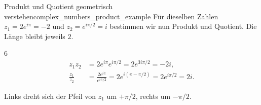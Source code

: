 \clearpage
\begin{ExampleBox}{Produkt und Quotient geometrisch verstehen}{complex_numbers_product_example}
  Für dieselben Zahlen $z_1=2e^{i\pi}=-2$ und $z_2=e^{i\pi/2}=i$
  bestimmen wir nun Produkt und Quotient. Die Länge bleibt jeweils $2$.
  \begin{ClozeArea}{6}
    \[
      \begin{aligned}
        z_1z_2&=2e^{i\pi}e^{i\pi/2}
                =2e^{3i\pi/2}=-2i,\\[8pt]
        \frac{z_1}{z_2}&=\frac{2e^{i\pi}}{e^{i\pi/2}}
                =2e^{i(\pi-\pi/2)}=2e^{i\pi/2}=2i.
      \end{aligned}
    \]
  \end{ClozeArea}
  \begin{center}
  \end{center}
  Links dreht sich der Pfeil von $z_1$ um $+\pi/2$, rechts um $-\pi/2$.
\end{ExampleBox}
